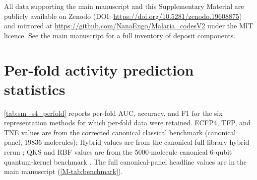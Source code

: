 \documentclass[11pt,a4paper]{article}
\begin{document}
All data supporting the main manuscript and this Supplementary Material are publicly available on Zenodo (DOI: \url{https://doi.org/10.5281/zenodo.19608875}) and mirrored at \url{https://github.com/NanaEngo/Malaria_codesV2} under the MIT licence. See the main manuscript for a full inventory of deposit components.






\section{Per-fold activity prediction statistics}
\label{sec:per_fold}

 \cref{tab:sm_s4_perfold} reports per-fold AUC, accuracy, and F1 for the six representation methods for which per-fold data were retained. ECFP4, TFP, and TNE values are from the corrected canonical classical benchmark (canonical panel, \num{19836} molecules); Hybrid values are from the canonical full-library hybrid rerun ; QKS and RBF values are from the \num{5000}-molecule canonical 6-qubit quantum-kernel benchmark . The full canonical-panel headline values are in the main manuscript (\cref{M-tab:benchmark}).
\end{document}
